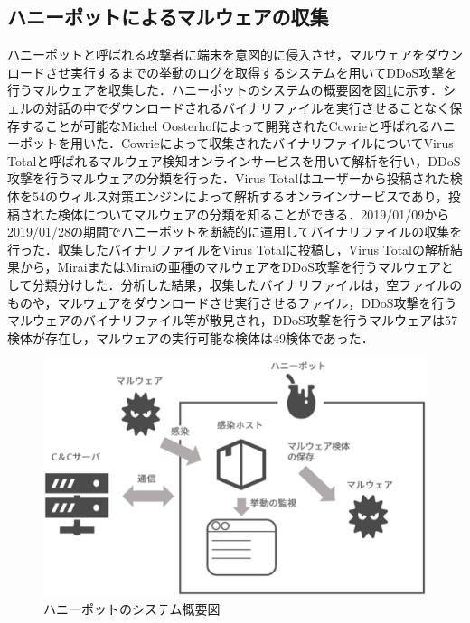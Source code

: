 \subsection{ハニーポットによるマルウェアの収集}
ハニーポットと呼ばれる攻撃者に端末を意図的に侵入させ，マルウェアをダウンロードさせ実行するまでの挙動のログを取得するシステムを用いてDDoS攻撃を行うマルウェアを収集した．ハニーポットのシステムの概要図を図\ref{fig:honey}に示す．シェルの対話の中でダウンロードされるバイナリファイルを実行させることなく保存することが可能なMichel Oosterhofによって開発されたCowrie\cite{Cowrie}と呼ばれるハニーポットを用いた．Cowrieによって収集されたバイナリファイルについてVirus Totalと呼ばれるマルウェア検知オンラインサービスを用いて解析を行い，DDoS攻撃を行うマルウェアの分類を行った．Virus Total\cite{Virus}はユーザーから投稿された検体を54のウィルス対策エンジンによって解析するオンラインサービスであり，投稿された検体についてマルウェアの分類を知ることができる．2019/01/09から2019/01/28の期間でハニーポットを断続的に運用してバイナリファイルの収集を行った．収集したバイナリファイルをVirus Totalに投稿し，Virus Totalの解析結果から，MiraiまたはMiraiの亜種のマルウェアをDDoS攻撃を行うマルウェアとして分類分けした．分析した結果，収集したバイナリファイルは，空ファイルのものや，マルウェアをダウンロードさせ実行させるファイル，DDoS攻撃を行うマルウェアのバイナリファイル等が散見され，DDoS攻撃を行うマルウェアは57検体が存在し，マルウェアの実行可能な検体は49検体であった．
\begin{figure}[h]
    \centering
       \includegraphics[width=120mm]{figures/honey.eps}
    \caption{ハニーポットのシステム概要図}
    \label{fig:honey}
\end{figure}

\newpage 
